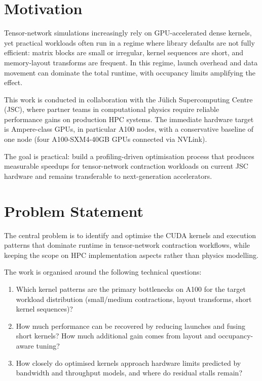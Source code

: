 \section{Motivation}\label{sec:motivation}

Tensor-network simulations increasingly rely on GPU-accelerated dense kernels,
yet practical workloads often run in a regime where library defaults are not
fully efficient: matrix blocks are small or irregular, kernel sequences are
short, and memory-layout transforms are frequent. In this regime, launch
overhead and data movement can dominate the total runtime, with occupancy limits
amplifying the effect.

This work is conducted in collaboration with the J\"ulich Supercomputing
Centre (JSC), where partner teams in computational physics require reliable
performance gains on production HPC systems. The immediate
hardware target is Ampere-class GPUs, in particular A100 nodes, with a
conservative baseline of one node (four A100-SXM4-40GB GPUs connected via
NVLink).

The goal is practical: build a profiling-driven optimisation process that
produces measurable speedups for tensor-network contraction workloads on current
JSC hardware and remains transferable to next-generation accelerators.

\section{Problem Statement}\label{sec:problem-statement}

The central problem is to identify and optimise the CUDA kernels and execution
patterns that dominate runtime in tensor-network contraction workflows, while
keeping the scope on HPC implementation aspects rather than physics modelling.

The work is organised around the following technical questions:

\begin{enumerate}
  \item Which kernel patterns are the primary bottlenecks on A100 for the target
    workload distribution (small/medium contractions, layout transforms, short
    kernel sequences)?
  \item How much performance can be recovered by reducing launches and fusing
    short kernels? How much additional gain comes from layout and
    occupancy-aware tuning?
  \item How closely do optimised kernels approach hardware limits predicted by
    bandwidth and throughput models, and where do residual stalls remain?
\end{enumerate}

